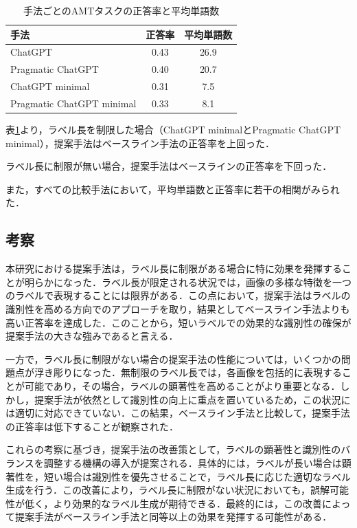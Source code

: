 \documentclass[a4paper,11pt]{jreport}
\begin{document}
\begin{table}[H]
\centering
\begin{tabular}{lcc}
\hline
手法 & 正答率 & 平均単語数 \\
\hline
ChatGPT & 0.43 & 26.9 \\
Pragmatic ChatGPT & 0.40 & 20.7 \\
ChatGPT minimal & 0.31 & 7.5 \\
Pragmatic ChatGPT minimal & 0.33 & 8.1 \\
\hline
\end{tabular}
\caption{手法ごとのAMTタスクの正答率と平均単語数}
\label{tab:accuracy_result}
\end{table}

表\ref{tab:accuracy_result}より，ラベル長を制限した場合（ChatGPT minimalとPragmatic ChatGPT minimal），提案手法はベースライン手法の正答率を上回った．

ラベル長に制限が無い場合，提案手法はベースラインの正答率を下回った．

また，すべての比較手法において，平均単語数と正答率に若干の相関がみられた．

\subsection{考察}
本研究における提案手法は，ラベル長に制限がある場合に特に効果を発揮することが明らかになった．ラベル長が限定される状況では，画像の多様な特徴を一つのラベルで表現することには限界がある．この点において，提案手法はラベルの識別性を高める方向でのアプローチを取り，結果としてベースライン手法よりも高い正答率を達成した．このことから，短いラベルでの効果的な識別性の確保が提案手法の大きな強みであると言える．

一方で，ラベル長に制限がない場合の提案手法の性能については，いくつかの問題点が浮き彫りになった．無制限のラベル長では，各画像を包括的に表現することが可能であり，その場合，ラベルの顕著性を高めることがより重要となる．しかし，提案手法が依然として識別性の向上に重点を置いているため，この状況には適切に対応できていない．この結果，ベースライン手法と比較して，提案手法の正答率は低下することが観察された．

これらの考察に基づき，提案手法の改善策として，ラベルの顕著性と識別性のバランスを調整する機構の導入が提案される．具体的には，ラベルが長い場合は顕著性を，短い場合は識別性を優先させることで，ラベル長に応じた適切なラベル生成を行う．この改善により，ラベル長に制限がない状況においても，誤解可能性が低く，より効果的なラベル生成が期待できる．最終的には，この改善によって提案手法がベースライン手法と同等以上の効果を発揮する可能性がある．
\end{document}
